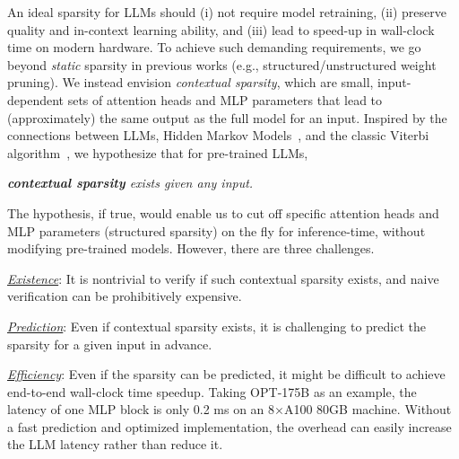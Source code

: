 An ideal sparsity for LLMs should (i) not require model retraining, (ii) preserve quality and in-context learning ability, and (iii) lead to speed-up in wall-clock time on modern hardware. To achieve such  demanding requirements, we go beyond \emph{static} sparsity in previous works (e.g., structured/unstructured weight pruning). We instead envision \emph{contextual sparsity}, which are small, input-dependent sets of attention heads and MLP parameters that lead to (approximately) the same output as the full model for an input. Inspired by the connections between LLMs, Hidden Markov Models~\citep{xie2022an, baum1966statistical}, and the classic Viterbi algorithm~\citep{viterbi1967error}, we hypothesize that for pre-trained LLMs,
\vspace{-2mm}
\begin{center}
\textit{\textbf{contextual sparsity} exists given any input.}
\end{center}
\vspace{-1mm}
The hypothesis, if true, would enable us to cut off specific attention heads and MLP parameters (structured sparsity) on the fly for inference-time, without modifying pre-trained models.
However, there are three challenges. 

\underline{\emph{Existence}}: It is nontrivial to verify if such contextual sparsity exists, and naive verification can be prohibitively expensive. 
  \vspace{-0.1mm}
  
\underline{\emph{Prediction}}: Even if contextual sparsity exists, it is challenging to predict the sparsity for a given input in advance. 
  
  \vspace{-0.1mm}
\underline{\emph{Efficiency}}: Even if the sparsity can be predicted, it might be difficult to achieve end-to-end wall-clock time speedup. Taking OPT-175B as an example, the latency of one MLP block is only 0.2 ms on an 8$\times$A100 80GB machine. Without a fast prediction and optimized implementation, the overhead can easily increase the LLM latency rather than reduce it.

